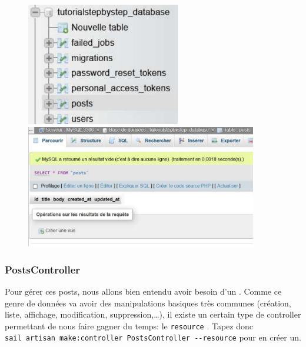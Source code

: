 \begin{figure}[!h]
    \centering
    \begin{minipage}{0.49\textwidth}
         \centering
         \includegraphics[width=0.6\textwidth]{figures-C1/db_posts_1.pdf}
    \end{minipage}
    \begin{minipage}{0.49\textwidth}
         \centering
         \includegraphics[width=0.9\textwidth]{figures-C1/db_posts_2.pdf}
    \end{minipage}
\end{figure}

\subsubsection[PostsController][laravel.com/docs/12.x/controllers\#resource-controllers]{PostsController}

Pour gérer ces posts, nous allons bien entendu avoir besoin d'un \controller{}. Comme ce genre de données va avoir des manipulations basiques très communes (création, liste, affichage, modification, suppression,\ldots), il existe un certain type de controller permettant de nous faire gagner du temps: le \texttt{resource} \controller{}. Tapez donc \\
\verb|sail artisan make:controller PostsController --resource| pour en créer un.

